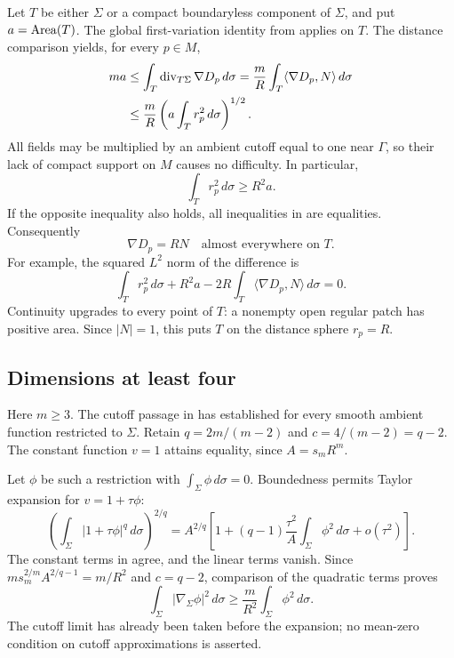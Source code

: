 Let $T$ be either $\Sigma$ or a compact boundaryless component of $\Sigma$,
and put $a=\operatorname{Area}(T)$. The global first-variation identity from
 applies on $T$. The distance comparison
 yields, for every $p\in M$,
\begin{align}
 ma
 &\le \int_T \operatorname{div}_{T\Sigma}\nabla D_p\,d\sigma
   =\frac mR\int_T\langle\nabla D_p,N\rangle\,d\sigma \notag\\
 &\le \frac mR\left(a\int_T r_p^2\,d\sigma\right)^{1/2}.
 \label{eq:flux-bound}
\end{align}
All fields may be multiplied by an ambient cutoff equal to one near
$\Gamma$, so their lack of compact support on $M$ causes no difficulty.
In particular,
\begin{equation}\label{eq:lower-moment}
 \int_T r_p^2\,d\sigma\ge R^2a.
\end{equation}
If the opposite inequality also holds, all inequalities in
 are equalities. Consequently
\begin{equation}\label{eq:radial-normal}
 \nabla D_p=RN\quad\text{almost everywhere on }T.
\end{equation}
For example, the squared $L^2$ norm of the difference is
\[
 \int_T r_p^2\,d\sigma+R^2a
       -2R\int_T\langle\nabla D_p,N\rangle\,d\sigma=0.
\]
Continuity upgrades  to every point of $T$:
a nonempty open regular patch has positive area. Since $|N|=1$,
this puts $T$ on the distance sphere $r_p=R$.

\subsection{Dimensions at least four}
Here $m\ge3$. The cutoff passage in 
has established  for every smooth ambient
function restricted to $\Sigma$. Retain
$q=2m/(m-2)$ and $c=4/(m-2)=q-2$.
The constant function $v=1$ attains equality, since $A=s_mR^m$.

Let $\phi$ be such a restriction with
$\int_\Sigma\phi\,d\sigma=0$. Boundedness permits Taylor expansion for
$v=1+\tau\phi$:
\begin{equation}\label{eq:critical-expansion}
 \left(\int_\Sigma|1+\tau\phi|^q\,d\sigma\right)^{2/q}
 =A^{2/q}\left[1+(q-1)\frac{\tau^2}{A}
                \int_\Sigma\phi^2\,d\sigma+o(\tau^2)\right].
\end{equation}
The constant terms in  agree, and the linear
terms vanish. Since $m s_m^{2/m}A^{2/q-1}=m/R^2$ and $c=q-2$,
comparison of the quadratic terms proves
\begin{equation}\label{eq:equality-spectral-gap}
 \int_\Sigma|\nabla_\Sigma\phi|^2\,d\sigma
 \ge \frac m{R^2}\int_\Sigma\phi^2\,d\sigma.
\end{equation}
The cutoff limit has already been taken before the expansion; no
mean-zero condition on cutoff approximations is asserted.

